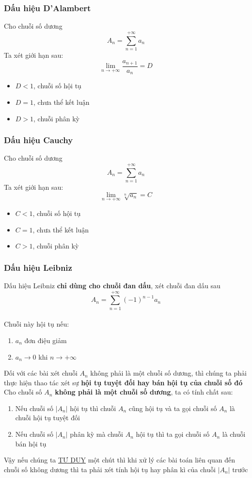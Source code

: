 \documentclass{article}
\begin{document}
\subsubsection{Dấu hiệu D'Alambert}
Cho chuỗi số dương $$A_{n}=\sum_{n=1}^{+\infty}a_{n}$$
Ta xét giới hạn sau: $$\lim_{n\to+\infty}\frac{a_{n+1}}{a_{n}}=D$$
\begin{itemize}
    \item $D<1$, chuỗi số hội tụ
    \item $D=1$, chưa thể kết luận
    \item $D>1$, chuỗi phân kỳ
\end{itemize}
\subsubsection{Dấu hiệu Cauchy}
Cho chuỗi số dương $$A_{n}=\sum_{n=1}^{+\infty}a_{n}$$
Ta xét giới hạn sau: $$\lim_{n\to+\infty}\sqrt[n]{a_{n}}=C$$
\begin{itemize}
    \item $C<1$, chuỗi số hội tụ
    \item $C=1$, chưa thể kết luận
    \item $C>1$, chuỗi phân kỳ
\end{itemize}
\subsubsection{Dấu hiệu Leibniz}
Dấu hiệu Leibniz \textbf{chỉ dùng cho chuỗi đan dấu}, xét chuỗi đan dấu sau $$A_{n}=\sum_{n=1}^{+\infty}(-1)^{n-1}a_{n}$$
\\ Chuỗi này hội tụ nếu:
\begin{enumerate}
    \item $a_{n}$ đơn điệu giảm
    \item $a_{n}\to 0$ khi $n\to+\infty$
\end{enumerate}
Đối với các bài xét chuỗi $A_{n}$ không phải là một chuỗi số dương, thì chúng ta phải thực hiện thao tác xét sự \textbf{hội tụ tuyệt đối hay bán hội tụ của chuỗi số đó}
\\ Cho chuỗi số $A_{n}$ \textbf{không phải là một chuỗi số dương}, ta có tính chất sau:
\begin{enumerate}
    \item Nếu chuỗi số $|A_{n}|$ hội tụ thì chuỗi $A_{n}$ cũng hội tụ và ta gọi chuỗi số $A_{n}$ là chuỗi hội tụ tuyệt đối
    \item Nếu chuỗi số $|A_{n}|$ phân kỳ mà chuỗi $A_{n}$ hội tụ thì ta gọi chuỗi số $A_{n}$ là chuỗi bán hội tụ
\end{enumerate}
Vậy nếu chúng ta \underline{TƯ DUY} một chút thì khi xử lý các bài toán liên quan đến chuỗi số không dương thì ta phải xét tính hội tụ hay phân kì của chuỗi $|A_{n}|$ trước
\end{document}

